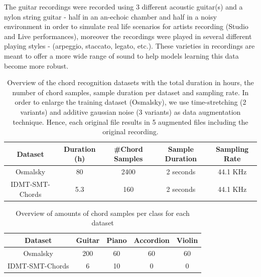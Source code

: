 \documentclass[a4paper]{article}
\begin{document}
The guitar recordings were recorded using 3 different acoustic guitar(s) and a nylon string guitar - half in an an-echoic chamber and half in a noisy environment in order to simulate real life scenarios for artists recording (Studio and Live performances), moreover the recordings were played in several different playing styles - (arpeggio, staccato, legato, etc.). These varieties in recordings are meant to offer a more wide range of sound to help models learning this data become more robust.\\
\begin{table}
\centering
\begin{adjustbox}{width=\linewidth}    
\begin{tabular}{c c c c c} %
\hline   
 Dataset & Duration (h) & \#Chord Samples  & Sample Duration & Sampling Rate\\
\hline\hline
Osmalsky & 80 & 2400 & 2 seconds & 44.1 KHz\\
IDMT-SMT-Chords & 5.3  & 160  & 2 seconds & 44.1 KHz\\
\hline
\end{tabular}  
    
\end{adjustbox}
\caption{Overview of the chord recognition datasets with
the total duration in
hours, the number of chord samples, sample duration per dataset and sampling rate.
In order to enlarge the training dataset (Osmalsky), we use time-stretching (2 variants) and additive gaussian noise (3 variants) as data augmentation technique. Hence, each original file
results in 5 augmented files including the original recording. 
}
\label{tab:list_of_datasets}
\end{table}
\begin{table}
\centering
\begin{adjustbox}{width=\columnwidth}
    
      
\begin{tabular}{c c c c c}
\hline   
 Dataset & Guitar & Piano & Accordion & Violin \\
\hline\hline
Osmalsky & 200 & 60 & 60 & 60\\
IDMT-SMT-Chords & 6 & 10 & 0 & 0 \\
\hline
\end{tabular}  
    
\end{adjustbox}
\caption{Overview of amounts of chord samples per class for each dataset
}
\label{tab:class_amounts}
\end{table}
\end{document}
